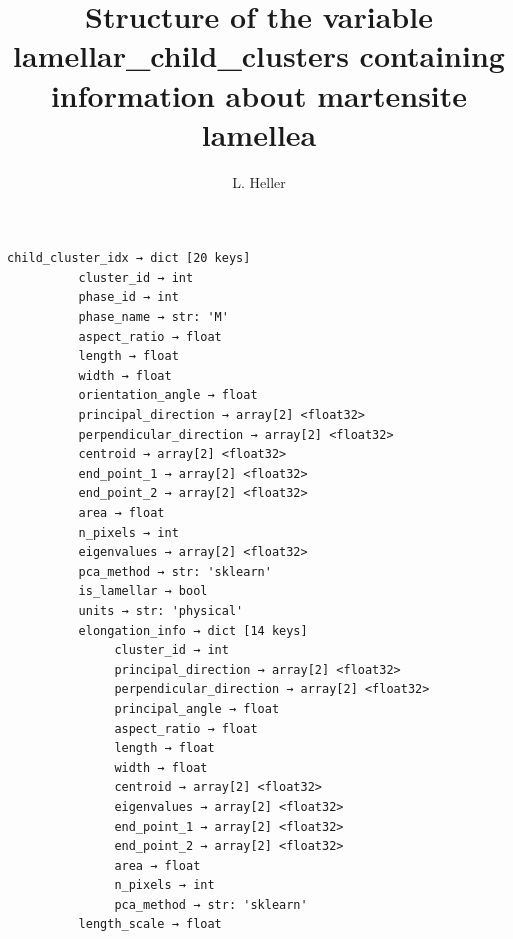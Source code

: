 \documentclass[a4paper,10pt]{article}
\title{Structure of the variable lamellar\_child\_clusters containing information about martensite lamellea}
\author{L. Heller}
\begin{document}
\maketitle
\begin{verbatim}
child_cluster_idx → dict [20 keys]
          cluster_id → int
          phase_id → int
          phase_name → str: 'M'
          aspect_ratio → float
          length → float
          width → float
          orientation_angle → float
          principal_direction → array[2] <float32>
          perpendicular_direction → array[2] <float32>
          centroid → array[2] <float32>
          end_point_1 → array[2] <float32>
          end_point_2 → array[2] <float32>
          area → float
          n_pixels → int
          eigenvalues → array[2] <float32>
          pca_method → str: 'sklearn'
          is_lamellar → bool
          units → str: 'physical'
          elongation_info → dict [14 keys]
               cluster_id → int
               principal_direction → array[2] <float32>
               perpendicular_direction → array[2] <float32>
               principal_angle → float
               aspect_ratio → float
               length → float
               width → float
               centroid → array[2] <float32>
               eigenvalues → array[2] <float32>
               end_point_1 → array[2] <float32>
               end_point_2 → array[2] <float32>
               area → float
               n_pixels → int
               pca_method → str: 'sklearn'
          length_scale → float
\end{verbatim}
\end{document}
